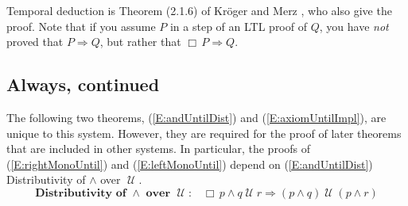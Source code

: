 \documentclass[12pt, fleqn, leqno]{article}
\newcommand{\lgap}{2pt}                             %
\newcommand{\mymathindent}{24pt}                    %
\newcommand{\impl}{\ensuremath{\Rightarrow}}        %
\newcommand{\Until}{\;\mathcal{U}\;}
\newcommand{\Always}{\Box\,}
\newcommand{\myqed}{\rule[-.23ex]{1.2ex}{2.0ex}}
\newcommand{\myqedtab}{\hspace{384pt}}              %
\newcommand{\Gll} {\langle}                         %
\newcommand{\Ggg} {\rangle}                         %
\newcommand{\Hint}[1]     {\ \ \ $\Gll              \mbox{#1} \Ggg$ }   %
\begin{document}
Temporal deduction is Theorem (2.1.6) of Kröger and Merz \cite{Kroger}, who also give the proof.
Note that if you assume $P$ in a step of an LTL proof of $Q$, you have \textit{not} proved that $P\impl Q$, but rather that $\Always P \impl Q$.


\subsection{Always, continued}\label{section-always-continued-1}

The following two theorems, (\ref{E:andUntilDist}) and (\ref{E:axiomUntilImpl}), are unique to this system.
However, they are required for the proof of later theorems that are included in other systems.
In particular, the proofs of (\ref{E:rightMonoUntil}) and (\ref{E:leftMonoUntil}) depend on (\ref{E:andUntilDist}) Distributivity of $\land$ over $\Until$.
\begin{equation}\label{E:andUntilDist}
\textbf{Distributivity of $\land$ over $\Until$:}\quad \Always p \land q \Until r \impl (p \land q) \Until (p \land r)
\end{equation}
\end{document}
